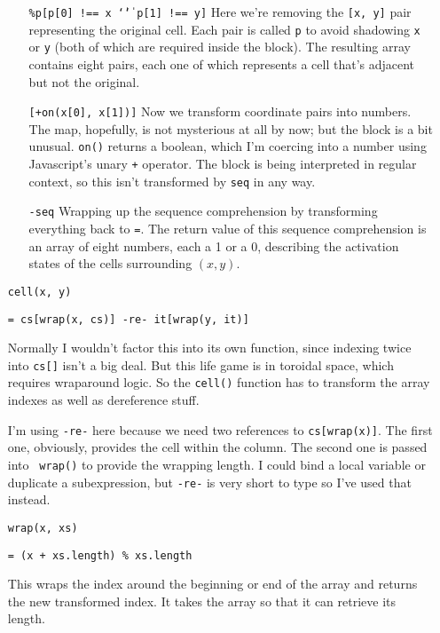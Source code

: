 \documentclass{report}
\begin{document}
\begin{enumerate}
\begin{enumerate}
\item[{\tt \%p[p[0] !== x \char `\| \char `\|~p[1] !== y]}]
  Here we're removing the {\tt [x, y]} pair representing the original cell. Each pair is called {\tt p} to avoid shadowing {\tt x} or {\tt y} (both of which are required inside the
  block). The resulting array contains eight pairs, each one of which represents a cell that's adjacent but not the original.

\item[{\tt *[+on(x[0], x[1])]}]
  Now we transform coordinate pairs into numbers. The map, hopefully, is not mysterious at all by now; but the block is a bit unusual. {\tt on()} returns a boolean, which I'm
  coercing into a number using Javascript's unary {\tt +} operator. The block is being interpreted in regular context, so this isn't transformed by {\tt seq} in any way.

\item[{\tt -seq}]
  Wrapping up the sequence comprehension by transforming everything back to {\tt =}. The return value of this sequence comprehension is an array of eight numbers, each a 1 or a 0,
  describing the activation states of the cells surrounding $(x, y)$.
\end{enumerate}

\item[{\tt cell(x, y)}]
\begin{verbatim}
= cs[wrap(x, cs)] -re- it[wrap(y, it)]
\end{verbatim}

  Normally I wouldn't factor this into its own function, since indexing twice into {\tt cs[]} isn't a big deal. But this life game is in toroidal space, which requires wraparound
  logic. So the {\tt cell()} function has to transform the array indexes as well as dereference stuff.

  I'm using {\tt -re-} here because we need two references to {\tt cs[wrap(x)]}. The first one, obviously, provides the cell within the column. The second one is passed into {\tt
  wrap()} to provide the wrapping length. I could bind a local variable or duplicate a subexpression, but {\tt -re-} is very short to type so I've used that instead.

\item[{\tt wrap(x, xs)}]
\begin{verbatim}
= (x + xs.length) % xs.length
\end{verbatim}

  This wraps the index around the beginning or end of the array and returns the new transformed index. It takes the array so that it can retrieve its length.


\end{enumerate}
\end{document}
